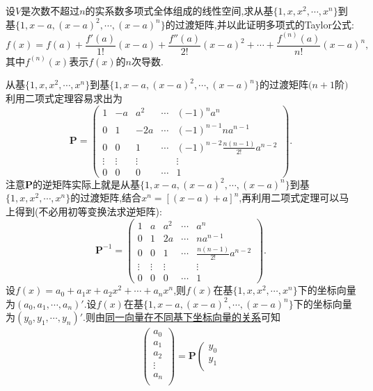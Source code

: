 \documentclass[../../main.tex]{subfiles}%
\begin{document}
\begin{example}
设\(V\)是次数不超过\(n\)的实系数多项式全体组成的线性空间,求从基\(\{1,x,x^2,\cdots,x^n\}\)到基\(\{1,x - a,(x - a)^2,\cdots,(x - a)^n\}\)的过渡矩阵,并以此证明多项式的Taylor公式:
\[
f(x)=f(a)+\frac{f'(a)}{1!}(x - a)+\frac{f''(a)}{2!}(x - a)^2+\cdots+\frac{f^{(n)}(a)}{n!}(x - a)^n,
\]
其中\(f^{(n)}(x)\)表示\(f(x)\)的\(n\)次导数.
\end{example}
\begin{solution}
从基\(\{1,x,x^2,\cdots,x^n\}\)到基\(\{1,x - a,(x - a)^2,\cdots,(x - a)^n\}\)的过渡矩阵\((n + 1\)阶\()\)利用二项式定理容易求出为
\[
\boldsymbol{P}=\begin{pmatrix}
1&-a&a^2&\cdots&(-1)^na^n\\
0&1&-2a&\cdots&(-1)^{n - 1}na^{n - 1}\\
0&0&1&\cdots&(-1)^{n - 2}\frac{n(n - 1)}{2!}a^{n - 2}\\
\vdots&\vdots&\vdots&&\vdots\\
0&0&0&\cdots&1
\end{pmatrix}.
\]
注意\(\boldsymbol{P}\)的逆矩阵实际上就是从基\(\{1,x - a,(x - a)^2,\cdots,(x - a)^n\}\)到基\(\{1,x,x^2,\cdots,x^n\}\)的过渡矩阵,结合$x^n=[(x-a)+a]^n$,再利用二项式定理可以马上得到(不必用初等变换法求逆矩阵):
\[
\boldsymbol{P}^{-1}=\begin{pmatrix}
1&a&a^2&\cdots&a^n\\
0&1&2a&\cdots&na^{n - 1}\\
0&0&1&\cdots&\frac{n(n - 1)}{2!}a^{n - 2}\\
\vdots&\vdots&\vdots&&\vdots\\
0&0&0&\cdots&1
\end{pmatrix}.
\]
设\(f(x)=a_0 + a_1x + a_2x^2+\cdots + a_nx^n\),则\(f(x)\)在基\(\{1,x ,x^2,\cdots,x^n\}\)下的坐标向量为$(a_0,a_1,\cdots,a_n)'$.设\(f(x)\)在基\(\{1,x - a,(x - a)^2,\cdots,(x - a)^n\}\)下的坐标向量为$(y_0,y_1,\cdots,y_n)'$.则由\hyperref[theorem:同一向量在不同基下坐标向量的关系]{同一向量在不同基下坐标向量的关系}可知
\begin{align*}
\left( \begin{array}{c}
a_0\\
a_1\\
a_2\\
\vdots\\
a_n\\
\end{array} \right) =\boldsymbol{P}\left( \begin{array}{c}
y_0\\
y_1\\

\end{array}
\end{align*}
\end{solution}
\end{document}
